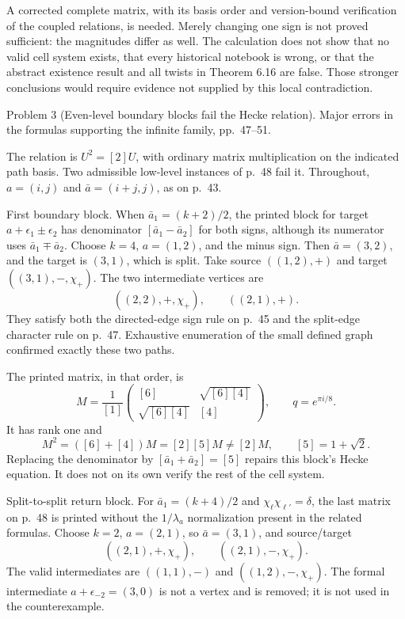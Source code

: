\documentclass[10pt]{article}
\begin{document}
A corrected complete matrix, with its basis order and version-bound verification of the coupled relations, is needed. Merely changing one sign is not proved sufficient: the magnitudes differ as well. The calculation does not show that no valid cell system exists, that every historical notebook is wrong, or that the abstract existence result and all twists in Theorem 6.16 are false. Those stronger conclusions would require evidence not supplied by this local contradiction.\par
Problem 3 (Even-level boundary blocks fail the Hecke relation).  Major errors in the formulas supporting the infinite family, pp. 47–51.\par
The relation is \(U^2=[2]U\), with ordinary matrix multiplication on the indicated path basis. Two admissible low-level instances of p. 48 fail it. Throughout, \(a=(i,j)\) and \(\bar a=(i+j,j)\), as on p. 43.\par
First boundary block. When \(\bar a_1=(k+2)/2\), the printed block for target \(a+\epsilon_1\pm\epsilon_2\) has denominator \([\bar a_1-\bar a_2]\) for both signs, although its numerator uses \(\bar a_1\mp\bar a_2\). Choose \(k=4\), \(a=(1,2)\), and the minus sign. Then \(\bar a=(3,2)\), and the target is \((3,1)\), which is split. Take source \(((1,2),+)\) and target \(((3,1),-,\chi_+)\). The two intermediate vertices are \[((2,2),+,\chi_+),\qquad ((2,1),+).\] They satisfy both the directed-edge sign rule on p. 45 and the split-edge character rule on p. 47. Exhaustive enumeration of the small defined graph confirmed exactly these two paths.\par
The printed matrix, in that order, is \[M=\frac1{[1]}
 \begin{pmatrix}[6]&\sqrt{[6][4]}\\
 \sqrt{[6][4]}&[4]\end{pmatrix},
 \qquad q=e^{\pi i/8}.\] It has rank one and \[M^2=([6]+[4])M=[2][5]M\ne[2]M,
 \qquad [5]=1+\sqrt2.\] Replacing the denominator by \([\bar a_1+\bar a_2]=[5]\) repairs this block’s Hecke equation. It does not on its own verify the rest of the cell system.\par
Split-to-split return block. For \(\bar a_1=(k+4)/2\) and \(\chi_\ell\chi_{\ell'}=\delta\), the last matrix on p. 48 is printed without the \(1/\lambda_a\) normalization present in the related formulas. Choose \(k=2\), \(a=(2,1)\), so \(\bar a=(3,1)\), and source/target \[((2,1),+,\chi_+),\qquad ((2,1),-,\chi_+).\] The valid intermediates are \(((1,1),-)\) and \(((1,2),-,\chi_+)\). The formal intermediate \(a+\epsilon_{-2}=(3,0)\) is not a vertex and is removed; it is not used in the counterexample.\par
\end{document}
